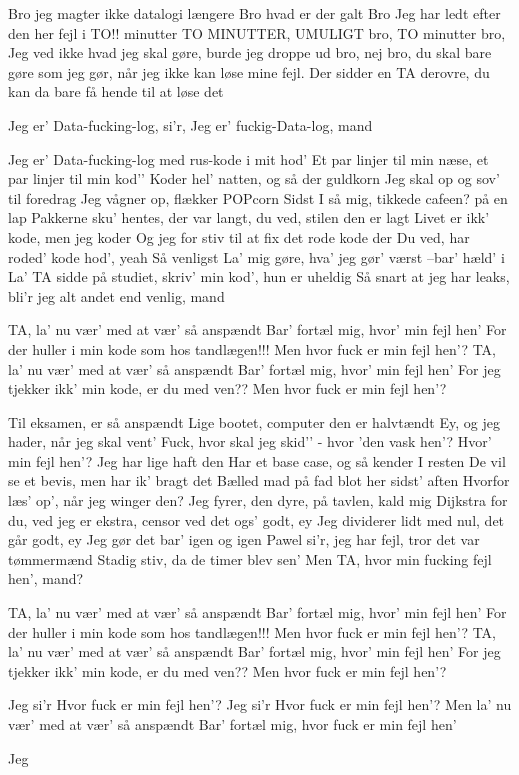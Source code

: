 \documentclass[a4paper,11pt]{article}
\begin{document}
\begin{song}
 Bro jeg magter ikke datalogi længere
 Bro hvad er der galt
 Bro Jeg har ledt efter den her fejl i TO!! minutter
 TO MINUTTER, UMULIGT bro, TO minutter
 bro, Jeg ved ikke hvad jeg skal gøre, burde jeg droppe ud
 bro, nej bro, du skal bare gøre som jeg gør, når jeg ikke kan løse mine fejl. Der sidder en TA derovre, du kan da bare få hende til at løse det










Jeg er' Data-fucking-log, si'r, Jeg er' fuckig-Data-log, mand

Jeg er' Data-fucking-log med rus-kode i mit hod’
Et par linjer til min næse, et par linjer til min kod’’
Koder hel’ natten, og så der guldkorn
Jeg skal op og sov’ til foredrag
Jeg vågner op, flækker POPcorn
Sidst I så mig, tikkede cafeen? på en lap
Pakkerne sku' hentes, der var langt, du ved, stilen den er lagt
Livet er ikk' kode, men jeg koder
Og jeg for stiv til at fix det rode kode der
Du ved, har roded’ kode hod’, yeah
Så venligst
La' mig gøre, hva' jeg gør' værst –bar' hæld' i
La' TA sidde på studiet, skriv’ min kod’, hun er uheldig
Så snart at jeg har leaks, bli'r jeg alt andet end venlig, mand

TA, la' nu vær' med at vær' så anspændt
Bar' fortæl mig, hvor' min fejl hen'
For der huller i min kode som hos tandlægen!!!
Men hvor fuck er min fejl hen'?
TA, la' nu vær' med at vær' så anspændt
Bar' fortæl mig, hvor' min fejl hen'
For jeg tjekker ikk’ min kode, er du med ven??
Men hvor fuck er min fejl hen'?

Til eksamen, er så anspændt
Lige bootet, computer den er halvtændt
Ey, og jeg hader, når jeg skal vent'
Fuck, hvor skal jeg skid’' - hvor 'den vask hen'?
Hvor' min fejl hen'? Jeg har lige haft den
Har et base case, og så kender I resten
De vil se et bevis, men har ik’ bragt det
Bælled mad på fad blot her sidst’ aften
Hvorfor læs’ op’, når jeg winger den?
Jeg fyrer, den dyre, på tavlen, kald mig Dijkstra for du, ved jeg er ekstra, censor ved det ogs' godt, ey
Jeg dividerer lidt med nul, det går godt, ey
Jeg gør det bar’ igen og igen
Pawel si’r, jeg har fejl, tror det var tømmermænd
Stadig stiv, da de timer blev sen’
Men TA, hvor min fucking fejl hen', mand?

TA, la' nu vær' med at vær' så anspændt
Bar' fortæl mig, hvor' min fejl hen'
For der huller i min kode som hos tandlægen!!!
Men hvor fuck er min fejl hen'?
TA, la' nu vær' med at vær' så anspændt
Bar' fortæl mig, hvor' min fejl hen'
For jeg tjekker ikk’ min kode, er du med ven??
Men hvor fuck er min fejl hen'?

Jeg si'r Hvor fuck er min fejl hen'?
Jeg si'r Hvor fuck er min fejl hen'?
Men la' nu vær' med at vær' så anspændt
Bar' fortæl mig, hvor fuck er min fejl hen'




 Jeg 
\end{song}
\end{document}
